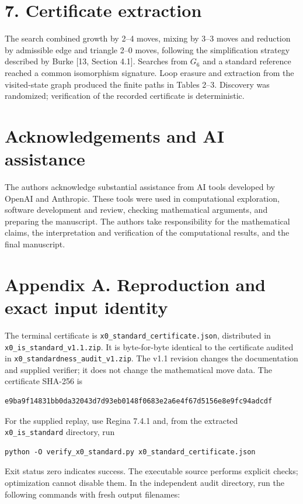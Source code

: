 \documentclass[11pt,letterpaper]{article}
\begin{document}
\section*{7. Certificate extraction}
The search combined growth by 2--4 moves, mixing by 3--3 moves and reduction by admissible edge and triangle 2--0 moves, following the simplification strategy described by Burke [13, Section 4.1]. Searches from $G_6$ and a standard reference reached a common isomorphism signature. Loop erasure and extraction from the visited-state graph produced the finite paths in Tables 2--3. Discovery was randomized; verification of the recorded certificate is deterministic.

\section*{Acknowledgements and AI assistance}
The authors acknowledge substantial assistance from AI tools developed by OpenAI and Anthropic. These tools were used in computational exploration, software development and review, checking mathematical arguments, and preparing the manuscript. The authors take responsibility for the mathematical claims, the interpretation and verification of the computational results, and the final manuscript.

\section*{Appendix A. Reproduction and exact input identity}
The terminal certificate is {\small\texttt{x0\_standard\_certificate.json}}, distributed in {\small\texttt{x0\_is\_standard\_v1.1.zip}}. It is byte-for-byte identical to the certificate audited in {\small\texttt{x0\_standardness\_audit\_v1.zip}}. The v1.1 revision changes the documentation and supplied verifier; it does not change the mathematical move data. The certificate SHA-256 is

\begin{Verbatim}
e9ba9f14831bb0da32043d7d93eb0148f0683e2a6e4f67d5156e8e9fc94adcdf
\end{Verbatim}
For the supplied replay, use Regina 7.4.1 and, from the extracted {\small\texttt{x0\_is\_standard}} directory, run

\begin{Verbatim}
python -O verify_x0_standard.py x0_standard_certificate.json
\end{Verbatim}
Exit status zero indicates success. The executable source performs explicit checks; optimization cannot disable them. In the independent audit directory, run the following commands with fresh output filenames:
\end{document}

